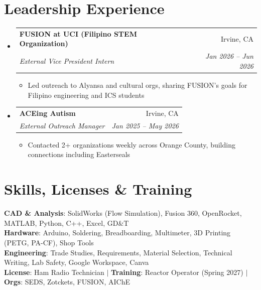 \documentclass[letterpaper,11pt]{article}
\makeatletter
\newcommand{\resumeItem}[1]{\item\small{{#1 \vspace{-2pt}}}}
\newcommand{\resumeSubheading}[4]{\vspace{-2pt}\item
  \begin{tabular*}{0.97\textwidth}[t]{l@{\extracolsep{\fill}}r}
    \textbf{#1} & #2 \\ \textit{\small#3} & \textit{\small #4} \\
  \end{tabular*}\vspace{-7pt}}
\newcommand{\resumeSubHeadingListStart}{\begin{itemize}[leftmargin=0.15in, label={}]}
\newcommand{\resumeSubHeadingListEnd}{\end{itemize}}
\newcommand{\resumeItemListStart}{\begin{itemize}}
\newcommand{\resumeItemListEnd}{\end{itemize}\vspace{-5pt}}
\makeatother
\begin{document}
\section{Leadership Experience}
\resumeSubHeadingListStart
  \resumeSubheading{FUSION at UCI (Filipino STEM Organization)}{Irvine, CA}{External Vice President Intern}{Jan 2026 -- Jun 2026}
  \resumeItemListStart
    \resumeItem{Led outreach to Alyansa and cultural orgs, sharing FUSION's goals for Filipino engineering and ICS students}
  \resumeItemListEnd
  \resumeSubheading{ACEing Autism}{Irvine, CA}{External Outreach Manager}{Jan 2025 -- May 2026}
  \resumeItemListStart
    \resumeItem{Contacted 2+ organizations weekly across Orange County, building connections including Easterseals}
  \resumeItemListEnd
\resumeSubHeadingListEnd

\section{Skills, Licenses \& Training}
\begin{itemize}[leftmargin=0.15in, label={}]
  \small{\item{
    \textbf{CAD \& Analysis}{: SolidWorks (Flow Simulation), Fusion 360, OpenRocket, MATLAB, Python, C++, Excel, GD\&T} \\
    \textbf{Hardware}{: Arduino, Soldering, Breadboarding, Multimeter, 3D Printing (PETG, PA-CF), Shop Tools} \\
    \textbf{Engineering}{: Trade Studies, Requirements, Material Selection, Technical Writing, Lab Safety, Google Workspace, Canva} \\
    \textbf{License}{: Ham Radio Technician} $|$ \textbf{Training}{: Reactor Operator (Spring 2027)} $|$ \textbf{Orgs}{: SEDS, Zotckets, FUSION, AIChE}
  }}
\end{itemize}
\end{document}
